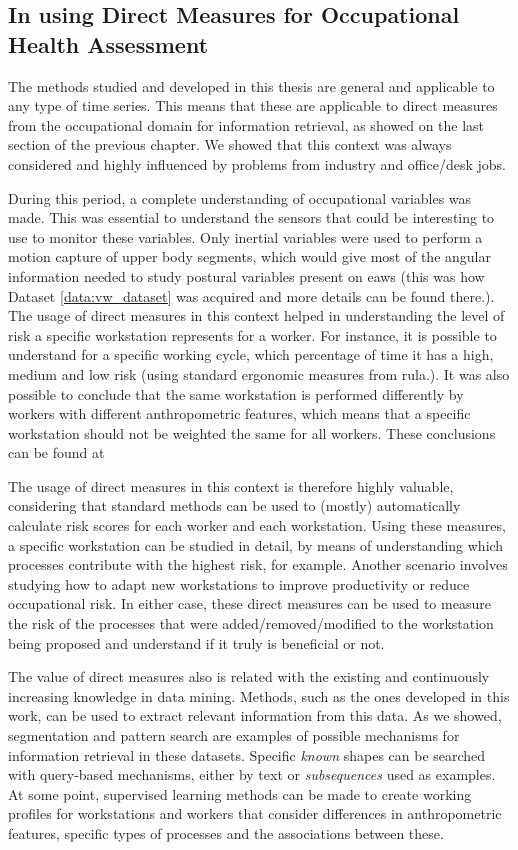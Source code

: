 \subsection{In using Direct Measures for Occupational Health Assessment}

The methods studied and developed in this thesis are general and applicable to any type of time series. This means that these are applicable to direct measures from the occupational domain for information retrieval, as showed on the last section of the previous chapter. We showed that this context was always considered and highly influenced by problems from industry and office/desk jobs. 
\par
During this period, a complete understanding of occupational variables was made. This was essential to understand the sensors that could be interesting to use to monitor these variables. Only inertial variables were used to perform a motion capture of upper body segments, which would give most of the angular information needed to study postural variables present on \gls{eaws} (this was how Dataset \ref{data:vw_dataset} was acquired and more details can be found there.). The usage of direct measures in this context helped in understanding the level of risk a specific workstation represents for a worker. For instance, it is possible to understand for a specific working cycle, which percentage of time it has a high, medium and low risk (using standard ergonomic measures from \gls{rula}.). It was also possible to conclude that the same workstation is performed differently by workers with different anthropometric features, which means that a specific workstation should not be weighted the same for all workers. These conclusions can be found at \cite{sara}
\par
The usage of direct measures in this context is therefore highly valuable, considering that standard methods can be used to (mostly) automatically calculate risk scores for each worker and each workstation. Using these measures, a specific workstation can be studied in detail, by means of understanding which processes contribute with the highest risk, for example. Another scenario involves studying how to adapt new workstations to improve productivity or reduce occupational risk. In either case, these direct measures can be used to measure the risk of the processes that were added/removed/modified to the workstation being proposed and understand if it truly is beneficial or not.
\par
The value of direct measures also is related with the existing and continuously increasing knowledge in data mining. Methods, such as the ones developed in this work, can be used to extract relevant information from this data. As we showed, segmentation and pattern search are examples of possible mechanisms for information retrieval in these datasets. Specific \textit{known} shapes can be searched with query-based mechanisms, either by text or \textit{subsequences} used as examples. At some point, supervised learning methods can be made to create working profiles for workstations and workers that consider differences in anthropometric features, specific types of processes and the associations between these. 
